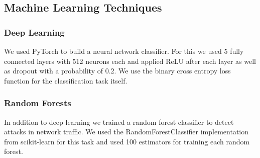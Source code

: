 \documentclass[10pt,sigconf,letterpaper,dvipsnames]{acmart}
\begin{document}

\subsection{Machine Learning Techniques}
\subsubsection{Deep Learning}
We used PyTorch to build a neural network classifier. For this we used 5 fully connected layers with 512 neurons each and applied ReLU after each layer as well as dropout with a probability of 0.2. We use the binary cross entropy loss function for the classification task itself.

\subsubsection{Random Forests}
In addition to deep learning we trained a random forest classifier to detect attacks in network traffic. We used the RandomForestClassifier implementation from scikit-learn for this task and used 100 estimators for training each random forest.
\end{document}
